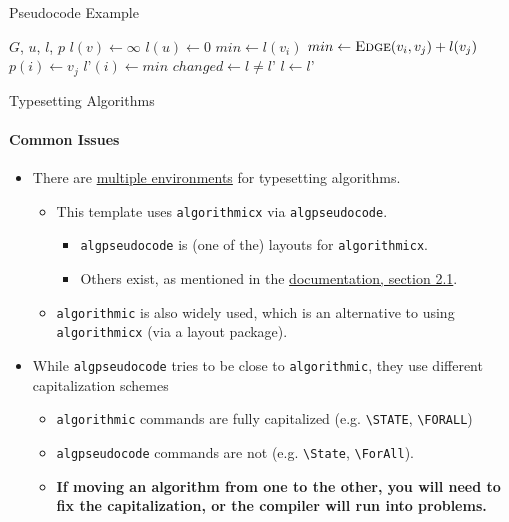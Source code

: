 \documentclass{beamer}
\newcommand{\hrefcol}[2]{\textcolor{uihteal}{\href{#1}{#2}}}
\begin{document}
\begin{frame}{Pseudocode Example}
	\begin{algorithm}[H]
		\fontsize{8}{1}\selectfont
		\caption{Bellman-Kalaba (adapted from \hrefcol{https://www.ctan.org/tex-archive/macros/latex/contrib/algorithmicx/algorithmicx.pdf}{algorithmicx documentation}).}
		\begin{algorithmic}
			\Require $G$, $u$, $l$, $p$
			\State $l(v) \leftarrow \infty$
			\EndFor
			\State $l(u) \leftarrow 0$
			\Repeat
			\State $min \leftarrow l(v_i)$
			\State $min \leftarrow \Call{Edge}{v_i, v_j} + l(v_j)$ 
			\State $p(i) \leftarrow v_j$
			\EndIf
			\EndFor
			\State $l’(i) \leftarrow min$
			\EndFor
			\State $changed \leftarrow l \not= l’$
			\State $l \leftarrow l’$
		\end{algorithmic}
	\end{algorithm}
\end{frame}

\begin{frame}[fragile]{Typesetting Algorithms}
	\framesubtitle{Common Issues}
	\begin{itemize}
		\item There are \hrefcol{https://tex.stackexchange.com/questions/229355}{multiple environments} for typesetting algorithms.
		      \begin{itemize}
			      \item This template uses \texttt{algorithmicx} via \texttt{algpseudocode}.
			            \begin{itemize}
				            \item \texttt{algpseudocode} is (one of the) layouts for \texttt{algorithmicx}.
				            \item Others exist, as mentioned in the \hrefcol{https://www.ctan.org/tex-archive/macros/latex/contrib/algorithmicx/algorithmicx.pdf}{documentation, section 2.1}.
			            \end{itemize}
			      \item \texttt{algorithmic} is also widely used, which is an alternative to using \texttt{algorithmicx} (via a layout package).
		      \end{itemize}
		\item While \texttt{algpseudocode} tries to be close to \texttt{algorithmic}, they use different capitalization schemes
		      \begin{itemize}
			      \item \texttt{algorithmic} commands are fully capitalized (e.g. \verb|\STATE|, \verb|\FORALL|)
			      \item \texttt{algpseudocode} commands are not (e.g. \verb|\State|, \verb|\ForAll|).
			      \item \textbf{If moving an algorithm from one to the other, you will need to fix the capitalization, or the compiler will run into problems.}
		      \end{itemize}
	\end{itemize}
\end{frame}
\end{document}
